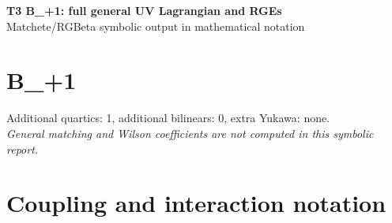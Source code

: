 \documentclass[10pt,a4paper]{article}
\begin{document}
\begin{center}
{\Large\bfseries T3 B\_+1: full general UV Lagrangian and RGEs}\\[4pt]
Matchete/RGBeta symbolic output in mathematical notation
\end{center}
\bigskip
\section*{B\_+1}
Additional quartics: 1, additional bilinears: 0, extra Yukawa: none.\\
\emph{General matching and Wilson coefficients are not computed in this symbolic report.}
\section*{Coupling and interaction notation}
\end{document}
